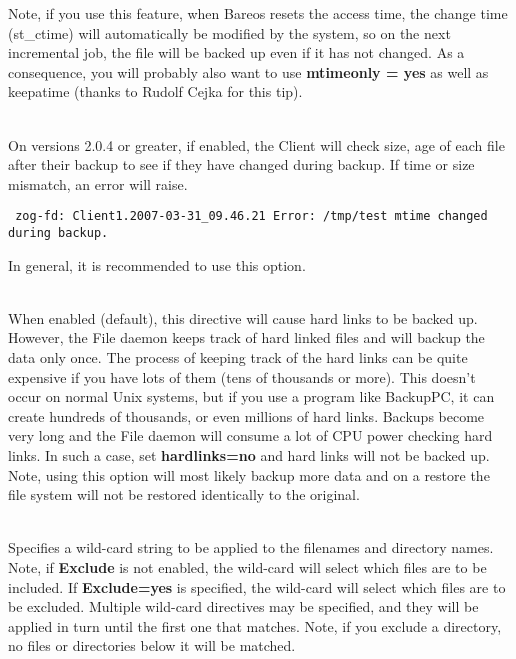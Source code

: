 \begin{description}
   Note, if you use this feature, when Bareos resets the access time, the
   change time (st\_ctime) will automatically be modified by the system,
   so on the next incremental job, the file will be backed up even if
   it has not changed. As a consequence, you will probably also want
   to use {\bf mtimeonly = yes} as well as keepatime (thanks to
   Rudolf Cejka for this tip).

\item [checkfilechanges=yes{\textbar}no] \hfill \\
   On versions 2.0.4 or greater,
   if enabled, the Client will check size, age of each file after
   their backup to see if they have changed during backup. If time
   or size mismatch, an error will raise.

\begin{verbatim}
 zog-fd: Client1.2007-03-31_09.46.21 Error: /tmp/test mtime changed during backup.
\end{verbatim}

   In general, it is recommended to use this option.

\item [hardlinks=yes{\textbar}no] \hfill \\
   When enabled (default), this directive will cause hard links to be
   backed up. However, the File daemon keeps track of hard linked files and
   will backup the data only once. The process of keeping track of the
   hard links can be quite expensive if you have lots of them (tens of
   thousands or more). This doesn't occur on normal Unix systems, but if
   you use a program like BackupPC, it can create hundreds of thousands, or
   even millions of hard links. Backups become very long and the File daemon
   will consume a lot of CPU power checking hard links.  In such a case,
   set {\bf hardlinks=no} and hard links will not be backed up.  Note, using
   this option will most likely backup more data and on a restore the file
   system will not be restored identically to the original.

\item [wild={\textless}string{\textgreater}] \hfill \\
   Specifies a wild-card string to be applied to the filenames and
   directory names.  Note, if {\bf Exclude} is not enabled, the wild-card
   will select which files are to be included.  If {\bf Exclude=yes} is
   specified, the wild-card will select which files are to be excluded.
   Multiple wild-card directives may be specified, and they will be applied
   in turn until the first one that matches.  Note, if you exclude a
   directory, no files or directories below it will be matched.


\end{description}
